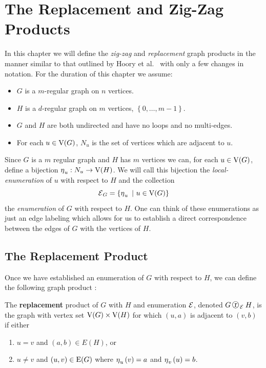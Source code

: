 \chapter{The Replacement and Zig-Zag Products}
\label{chapt:old_zz}

In this chapter we will define the {\em zig-zag} and {\em replacement} graph products in the manner similar to that outlined by Hoory {et al.\ }\cite{Hoory:2006bh} with only a few changes in notation. For the duration of this chapter we assume: 

\begin{itemize}
\item $G$ is a $m$-regular graph on $n$ vertices.
\item $H$ is a $d$-regular graph on $m$ vertices, $\left\{0,\ldots,m-1\right\}$.
\item $G$ and $H$ are both undirected and have no loops and no multi-edges.  
\item For each $u \in \mathrm{V}(G)$, $N_{u}$ is the set of vertices which are adjacent to $u$.  
\end{itemize}

\noindent
Since $G$ is a $m$ regular graph and $H$ has $m$ vertices we can, for each $u \in \mathrm{V}(G)$, define a bijection $\operatorname{\eta}_{u}: N_{u} \to \mathrm{V}(H)$. We will call this bijection the {\em local-enumeration} of $u$ with respect to $H$ and the collection  \[ \operatorname{\mathcal{E}}_{G} = \left\{ \operatorname{\eta}_{u} \ \vert \ u \in \mathrm{V}(G)  \right\}   \] the {\em enumeration} of $G$ with respect to $H$. One can think of these enumerations as just an edge labeling which allows for us to establish a direct correspondence between the edges of $G$ with the vertices of $H$.

\section{The Replacement Product}
\label{sec:replacement-product}

Once we have established an enumeration of $G$ with respect to $H$, we can define the following graph product
:
\begin{definition}
\label{def:replacement_product}
The {\bf replacement} product of $G$ with $H$ and enumeration $\operatorname{\mathcal{E}}$, denoted $G \replacement_{\Enum} H$, is the graph with vertex set $\mathrm{V}(G) \times \mathrm{V}(H)$ for which $\left( u, a \right)$ is adjacent to $ \left( v, b \right)$ if either
\begin{enumerate}
\item \label{itm:rep_zig} $u = v$ and $\left( a, b\right) \in E(H)$, or
\item  \label{itm:rep_zag} $u \neq v$ and  $\left( u, v \right) \in \mathrm{E}(G) $ where $\operatorname{\eta}_{u}\left( v \right) = a $ and $\operatorname{\eta}_{v}\left(u\right) = b$.
\end{enumerate}
\end{definition}

